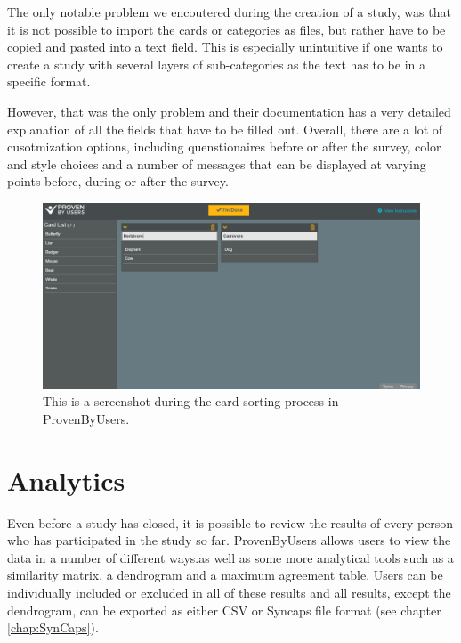 The only notable problem we encoutered during the creation of a study, was 
that it is not possible to import the cards or categories as files, but rather 
have to be copied and pasted into a text field. This is especially unintuitive 
if one wants to create a study with several layers of sub-categories as the 
text has to be in a specific format. 

However, that was the only problem and their documentation has a very detailed 
explanation of all the fields that have to be filled out. Overall, there are a 
lot of cusotmization options, including quenstionaires before or after the 
survey, color and style choices and a number of messages that can be displayed 
at varying points before, during or after the survey.

\begin{figure}[tp] 
\centering
\includegraphics[keepaspectratio,width=\linewidth,height=\halfh]{images/provenbyusers-sorting.png}
\caption[ProvenByUsers Card Sorting] { This is a screenshot during the card
sorting process in ProvenByUsers.
 }
\label{fig:ProvenByUsers2}
\end{figure}


\section{Analytics}
Even before a study has closed, it is possible to review the results of every 
person who has participated in the study so far. ProvenByUsers allows users to 
view the data in a number of different ways.as well as some more analytical 
tools such as a similarity matrix, a dendrogram and a maximum agreement table. 
Users can be individually included or excluded in all of these results and all 
results, except the dendrogram, can be exported as either CSV or Syncaps
 file format (see chapter \ref{chap:SynCaps}).

